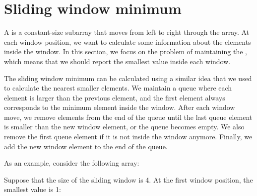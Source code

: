 \section{Sliding window minimum}


A  is a constant-size subarray
that moves from left to right through the array.
At each window position,
we want to calculate some information
about the elements inside the window.
In this section, we focus on the problem
of maintaining the ,
which means that
we should report the smallest value inside each window.

The sliding window minimum can be calculated
using a similar idea that we used to calculate
the nearest smaller elements.
We maintain a queue
where each element is larger than
the previous element,
and the first element
always corresponds to the minimum element inside the window.
After each window move,
we remove elements from the end of the queue
until the last queue element
is smaller than the new window element,
or the queue becomes empty.
We also remove the first queue element
if it is not inside the window anymore.
Finally, we add the new window element
to the end of the queue.

As an example, consider the following array:

\begin{center}
\end{center}

Suppose that the size of the sliding window is 4.
At the first window position, the smallest value is 1:
\begin{center}
\end{center}

